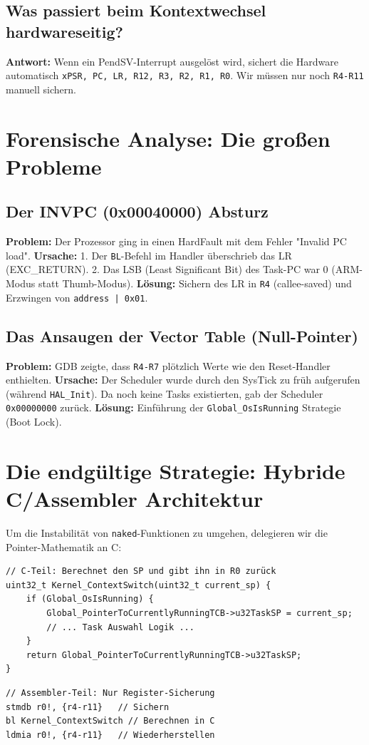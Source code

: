 \documentclass[11pt,a4paper]{article}
\begin{document}
\subsection{Was passiert beim Kontextwechsel hardwareseitig?}
\textbf{Antwort:} Wenn ein PendSV-Interrupt ausgelöst wird, sichert die Hardware automatisch \texttt{xPSR, PC, LR, R12, R3, R2, R1, R0}. Wir müssen nur noch \texttt{R4-R11} manuell sichern.

\section{Forensische Analyse: Die großen Probleme}

\subsection{Der INVPC (0x00040000) Absturz}
\textbf{Problem:} Der Prozessor ging in einen HardFault mit dem Fehler "Invalid PC load".
\textbf{Ursache:} 
1. Der \texttt{BL}-Befehl im Handler überschrieb das LR (EXC_RETURN).
2. Das LSB (Least Significant Bit) des Task-PC war 0 (ARM-Modus statt Thumb-Modus).
\textbf{Lösung:} Sichern des LR in \texttt{R4} (callee-saved) und Erzwingen von \texttt{address | 0x01}.

\subsection{Das Ansaugen der Vector Table (Null-Pointer)}
\textbf{Problem:} GDB zeigte, dass \texttt{R4-R7} plötzlich Werte wie den Reset-Handler enthielten.
\textbf{Ursache:} Der Scheduler wurde durch den SysTick zu früh aufgerufen (während \texttt{HAL_Init}). Da noch keine Tasks existierten, gab der Scheduler \texttt{0x00000000} zurück.
\textbf{Lösung:} Einführung der \texttt{Global_OsIsRunning} Strategie (Boot Lock).

\section{Die endgültige Strategie: Hybride C/Assembler Architektur}
Um die Instabilität von \texttt{naked}-Funktionen zu umgehen, delegieren wir die Pointer-Mathematik an C:
\begin{lstlisting}
// C-Teil: Berechnet den SP und gibt ihn in R0 zurück
uint32_t Kernel_ContextSwitch(uint32_t current_sp) {
    if (Global_OsIsRunning) {
        Global_PointerToCurrentlyRunningTCB->u32TaskSP = current_sp;
        // ... Task Auswahl Logik ...
    }
    return Global_PointerToCurrentlyRunningTCB->u32TaskSP;
}
\end{lstlisting}
\begin{lstlisting}
// Assembler-Teil: Nur Register-Sicherung
stmdb r0!, {r4-r11}   // Sichern
bl Kernel_ContextSwitch // Berechnen in C
ldmia r0!, {r4-r11}   // Wiederherstellen
\end{lstlisting}
\end{document}
